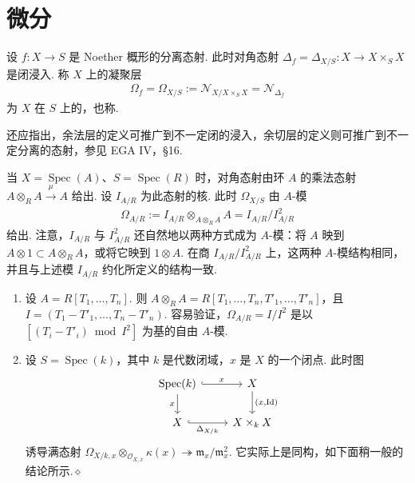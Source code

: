 \section{微分}\label{sec:ag-3-2}
\begin{definition}\label{item:ag-3-2-1}
设 $f:X\longrightarrow S$ 是 Noether 概形的分离态射. 此时对角态射 $\Delta_f=\Delta_{X/S}:X\longrightarrow X\times_SX$ 是闭浸入. 称 $X$ 上的凝聚层
\begin{align*}
\Omega_f=\Omega_{X/S}:=\mathcal N_{X/X\times_SX}=\mathcal N_{\Delta_f}
\end{align*}
为 $X$ 在 $S$ 上的，也称.
\end{definition}
{\small 还应指出，余法层的定义可推广到不一定闭的浸入，余切层的定义则可推广到不一定分离的态射，参见 EGA IV，§16.\par}
当 $X=\operatorname{Spec}(A)$、$S=\operatorname{Spec}(R)$ 时，对角态射由环 $A$ 的乘法态射 $A\otimes_RA\xrightarrow\mu A$ 给出. 设 $I_{A/R}$ 为此态射的核. 此时 $\Omega_{X/S}$ 由 $A$-模
\begin{align*}
\Omega_{A/R}:=I_{A/R}\otimes_{A\otimes_RA}A=I_{A/R}/I_{A/R}^2
\end{align*}
给出. 注意，$I_{A/R}$ 与 $I_{A/R}^2$ 还自然地以两种方式成为 $A$-模：将 $A$ 映到 $A\otimes1\subset A\otimes_RA$，或将它映到 $1\otimes A$. 在商 $I_{A/R}/I_{A/R}^2$ 上，这两种 $A$-模结构相同，并且与上述模 $I_{A/R}$ 约化所定义的结构一致.
\begin{example}\label{item:ag-3-2-2}
\begin{enumerate}[label=(\roman*)]
\item 设 $A=R[T_1,\ldots,T_n]$. 则 $A\otimes_RA=R[T_1,\ldots,T_n,T'_1,\ldots,T'_n]$，且 $I=(T_1-T'_1,\ldots,T_n-T'_n)$. 容易验证，$\Omega_{A/R}=I/I^2$ 是以 $[(T_i-T'_i)\bmod I^2]$ 为基的自由 $A$-模.
\item 设 $S=\operatorname{Spec}(k)$，其中 $k$ 是代数闭域，$x$ 是 $X$ 的一个闭点. 此时图
\begin{align*}
\begin{tikzcd}[ampersand replacement=\&]
\operatorname{Spec}(k)\arrow[r,hook,"x"]\arrow[d,"x"'] \& X\arrow[d,"{(x,\operatorname{Id})}"]\\
X\arrow[r,hook,"\Delta_{X/k}"'] \& X\times_kX
\end{tikzcd}
\end{align*}
诱导满态射 $\Omega_{X/k,x}\otimes_{\mathcal O_{X,x}}\kappa(x)\twoheadrightarrow\mathfrak m_x/\mathfrak m_x^2$. 它实际上是同构，如下面稍一般的结论所示.\unskip\nobreak\hfill\ensuremath{\diamond}
\end{enumerate}
\renewcommand{\envenddiamond}{}
\end{example}
